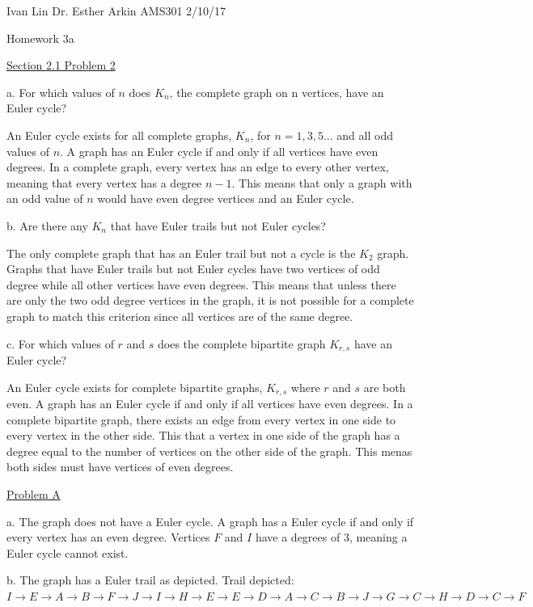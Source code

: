 \documentclass{article}
\begin{document}
Ivan Lin\newline{}
Dr. Esther Arkin\newline{}
AMS301\newline{}
2/10/17

\begin{center}
  Homework 3a
\end{center}

\underline{Section 2.1 Problem 2}

a. For which values of $n$ does $K_n$, the complete graph on n vertices, have an Euler cycle?

An Euler cycle exists for all complete graphs, $K_n$, for $n=1,3,5...$ and all odd values of $n$. A graph has an Euler cycle if and only if all vertices have even degrees. In a complete graph, every vertex has an edge to every other vertex, meaning that every vertex has a degree $n-1$. This means that only a graph with an odd value of $n$ would have even degree vertices and an Euler cycle.

b. Are there any $K_n$ that have Euler trails but not Euler cycles?

The only complete graph that has an Euler trail but not a cycle is the $K_2$ graph. Graphs that have Euler trails but not Euler cycles have two vertices of odd degree while all other vertices have even degrees. This means that unless there are only the two odd degree vertices in the graph, it is not possible for a complete graph to match this criterion since all vertices are of the same degree.

c. For which values of $r$ and $s$ does the complete bipartite graph $K_{r,s}$ have an Euler cycle?

An Euler cycle exists for complete bipartite graphs, $K_{r,s}$ where $r$ and $s$ are both even. A graph has an Euler cycle if and only if all vertices have even degrees. In a complete bipartite graph, there exists an edge from every vertex in one side to every vertex in the other side. This that a vertex in one side of the graph has a degree equal to the number of vertices on the other side of the graph. This menas both sides must have vertices of even degrees.

\underline{Problem A}

a. The graph does not have a Euler cycle. A graph has a Euler cycle if and only if every vertex has an even degree. Vertices $F$ and $I$ have a degrees of 3, meaning a Euler cycle cannot exist.

b. The graph has a Euler trail as depicted. Trail depicted: $I\rightarrow E\rightarrow A\rightarrow B\rightarrow F\rightarrow J\rightarrow I\rightarrow H\rightarrow E\rightarrow E\rightarrow D\rightarrow A\rightarrow C\rightarrow B\rightarrow J\rightarrow G\rightarrow C\rightarrow H\rightarrow D\rightarrow C\rightarrow F$
\end{document}
